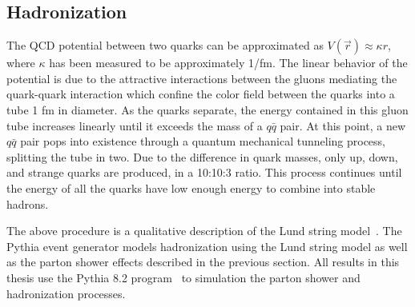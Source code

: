 \subsection{Hadronization}

The QCD potential between two quarks can be approximated as $ V(\vec r) \approx \kappa r$, where $\kappa$ has been measured to be approximately 1\unit{\GeVns/fm}.
The linear behavior of the potential is due to the attractive interactions between the gluons mediating the quark-quark interaction which confine the color field between the quarks into a tube 1 fm in diameter.
As the quarks separate, the energy contained in this gluon tube increases linearly until it exceeds the mass of a $q\bar q$ pair.
At this point, a new $q \bar q$ pair pops into existence through a quantum mechanical tunneling process, splitting the tube in two.
Due to the difference in quark masses, only up, down, and strange quarks are produced, in a 10:10:3 ratio.
This process continues until the energy of all the quarks have low enough energy to combine into stable hadrons.

The above procedure is a qualitative description of the Lund string model~\cite{Anderson1983}.
The Pythia event generator models hadronization using the Lund string model as well as the parton shower effects described in the previous section.
All results in this thesis use the Pythia 8.2 program~\cite{Sjostrand2015} to simulation the parton shower and hadronization processes. 

